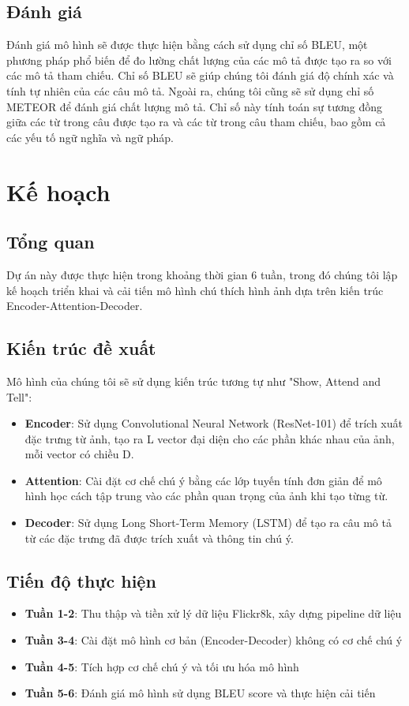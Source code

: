 \documentclass[conference]{IEEEtran}
\begin{document}
\subsection{Đánh giá}

Đánh giá mô hình sẽ được thực hiện bằng cách sử dụng chỉ số BLEU, một phương pháp phổ biến để đo lường chất lượng của các mô tả được tạo ra so với các mô tả tham chiếu. Chỉ số BLEU sẽ giúp chúng tôi đánh giá độ chính xác và tính tự nhiên của các câu mô tả.
Ngoài ra, chúng tôi cũng sẽ sử dụng chỉ số METEOR để đánh giá chất lượng mô tả. Chỉ số này tính toán sự tương đồng giữa các từ trong câu được tạo ra và các từ trong câu tham chiếu, bao gồm cả các yếu tố ngữ nghĩa và ngữ pháp.

\section{Kế hoạch}
\subsection{Tổng quan}
Dự án này được thực hiện trong khoảng thời gian 6 tuần, trong đó chúng tôi lập kế hoạch triển khai và cải tiến mô hình chú thích hình ảnh dựa trên kiến trúc Encoder-Attention-Decoder.
\subsection{Kiến trúc đề xuất}
Mô hình của chúng tôi sẽ sử dụng kiến trúc tương tự như "Show, Attend and Tell":
\begin{itemize}
    \item \textbf{Encoder}: Sử dụng Convolutional Neural Network (ResNet-101) để trích xuất đặc trưng từ ảnh, tạo ra L vector đại diện cho các phần khác nhau của ảnh, mỗi vector có chiều D.
    \item \textbf{Attention}: Cài đặt cơ chế chú ý bằng các lớp tuyến tính đơn giản để mô hình học cách tập trung vào các phần quan trọng của ảnh khi tạo từng từ.
    \item \textbf{Decoder}: Sử dụng Long Short-Term Memory (LSTM) để tạo ra câu mô tả từ các đặc trưng đã được trích xuất và thông tin chú ý.
\end{itemize}

\subsection{Tiến độ thực hiện}
\begin{itemize}
    \item \textbf{Tuần 1-2}: Thu thập và tiền xử lý dữ liệu Flickr8k, xây dựng pipeline dữ liệu
    \item \textbf{Tuần 3-4}: Cài đặt mô hình cơ bản (Encoder-Decoder) không có cơ chế chú ý
    \item \textbf{Tuần 4-5}: Tích hợp cơ chế chú ý và tối ưu hóa mô hình
    \item \textbf{Tuần 5-6}: Đánh giá mô hình sử dụng BLEU score và thực hiện cải tiến
\end{itemize}
\end{document}
